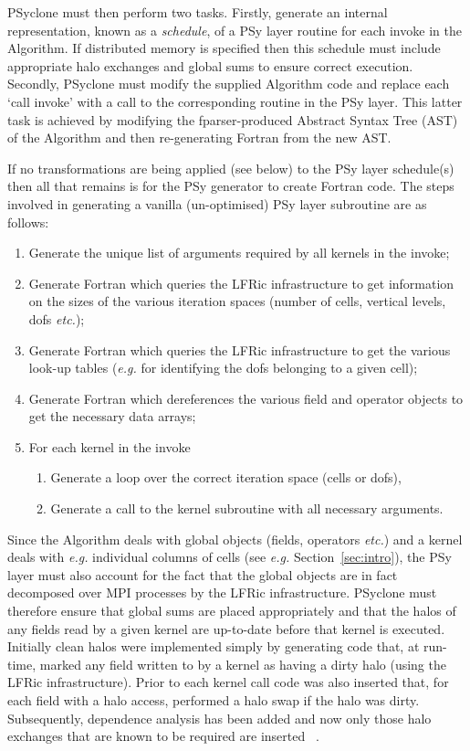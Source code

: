 \documentclass[review,times]{elsarticle}
\begin{document}
PSyclone must then perform two tasks. Firstly, generate an internal
representation, known as a {\em schedule}, of a PSy layer routine for each invoke in
the Algorithm. If distributed memory is specified then this schedule
must include appropriate halo exchanges and global sums to ensure
correct execution. Secondly, PSyclone must modify the supplied Algorithm
code and replace each `call invoke' with a call to the corresponding
routine in the PSy layer. This latter task is achieved by modifying
the fparser-produced Abstract Syntax Tree (AST) of the Algorithm and
then re-generating Fortran from the new AST.

If no transformations are being applied (see below) to the PSy layer
schedule(s) then all that remains is for the PSy generator to create
Fortran code.  The steps involved in generating a vanilla
(un-optimised) PSy layer subroutine are as follows:
\begin{enumerate}
\item Generate the unique list of arguments required by all kernels
  in the invoke;
\item Generate Fortran which queries the LFRic infrastructure to get
  information on the sizes of the various iteration spaces (number of cells,
  vertical levels, dofs {\em etc.});
\item Generate Fortran which queries the LFRic infrastructure to get the
  various look-up tables ({\em e.g.} for identifying the dofs belonging to a
  given cell);
\item Generate Fortran which dereferences the various field and operator
  objects to get the necessary data arrays;
\item For each kernel in the invoke
  \begin{enumerate}
    \item Generate a loop over the correct iteration space (cells or dofs),
    \item Generate a call to the kernel subroutine with all necessary arguments.
  \end{enumerate}
\end{enumerate}

Since the Algorithm deals with global objects
(fields, operators {\em etc.})  and a kernel deals with {\em e.g.} individual
columns of cells (see {\em e.g.} Section~\ref{sec:intro}), 
the PSy layer must also account for the fact that
the global objects are in fact decomposed over MPI processes by the
LFRic infrastructure. PSyclone must therefore ensure that global sums
are placed appropriately and that the halos of any fields read by a
given kernel are up-to-date before that kernel is executed. Initially
clean halos were implemented simply by generating code that, at
run-time, marked any field written to by a kernel as having a dirty
halo (using the LFRic infrastructure). Prior to each kernel call code
was also inserted that, for each field with a halo access, performed a
halo swap if the halo was dirty. Subsequently, dependence analysis has
been added and now only those halo exchanges that are known to be
required are inserted ~\cite{psyclone}.
\end{document}
